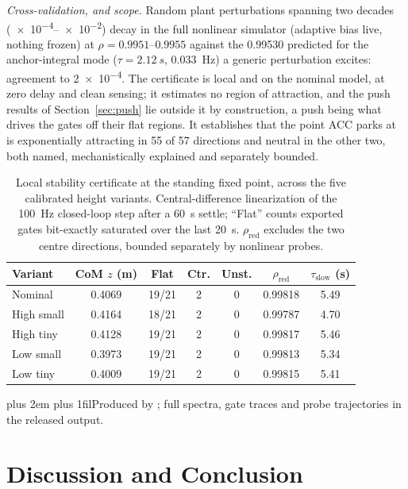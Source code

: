 \documentclass{jcd}
\newcommand{\tabnote}{\par\leftskip=0pt\rightskip=0pt plus 2em%
  \parfillskip=0pt plus 1fil\relax}
\begin{document}
\emph{Cross-validation, and scope.} Random plant perturbations spanning two
decades (\numrange{e-4}{e-2}) decay in the full nonlinear simulator (adaptive bias live, nothing frozen) at $\rho{=}0.9951$--$0.9955$ against the
\num{0.99530} predicted for the anchor-integral mode ($\tau{=}\SI{2.12}{s}$,
\SI{0.033}{Hz}) a generic perturbation excites: agreement to \num{2e-4}. The
certificate is local and on the nominal model, at zero delay and clean sensing;
it estimates no region of attraction, and the push results of
Section~\ref{sec:push} lie outside it by construction, a push being what drives
the gates off their flat regions. It establishes that the point ACC parks at is
exponentially attracting in \num{55} of \num{57} directions and neutral in the
other two, both named, mechanistically explained and separately bounded.

\begin{table}[htbp]
\centering
\caption{Local stability certificate at the standing fixed point, across the five
calibrated height variants. Central-difference linearization of the \SI{100}{Hz}
closed-loop step after a \SI{60}{s} settle; ``Flat'' counts exported gates
bit-exactly saturated over the last \SI{20}{s}. $\rho_{\text{red}}$ excludes the
two centre directions, bounded separately by nonlinear probes.}
\label{tab:stability}
\setlength{\tabcolsep}{4pt}
\footnotesize
\begin{tabular}{@{}lcccccc@{}}
\toprule
Variant & CoM $z$ (m) & Flat & Ctr. & Unst. & $\rho_{\text{red}}$ & $\tau_{\text{slow}}$ (s) \\
\midrule
Nominal    & 0.4069 & 19/21 & 2 & 0 & 0.99818 & 5.49 \\
High small & 0.4164 & 18/21 & 2 & 0 & 0.99787 & 4.70 \\
High tiny  & 0.4128 & 19/21 & 2 & 0 & 0.99817 & 5.46 \\
Low small  & 0.3973 & 19/21 & 2 & 0 & 0.99813 & 5.34 \\
Low tiny   & 0.4009 & 19/21 & 2 & 0 & 0.99815 & 5.41 \\
\bottomrule
\end{tabular}
\tabnote\noindent Produced by ; full
spectra, gate traces and probe trajectories in the released output.
\end{table}

\section{Discussion and Conclusion}
\label{sec:discussion}
\end{document}
